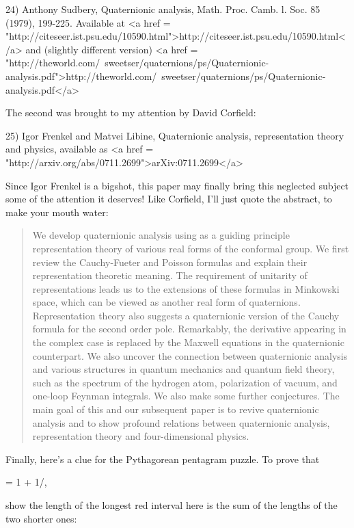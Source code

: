 24) Anthony Sudbery, Quaternionic analysis, Math. Proc. Camb. \Phi l. 
Soc. 85 (1979),  199-225.  Available at 
<a href = "http://citeseer.ist.psu.edu/10590.html">http://citeseer.ist.psu.edu/10590.html</a>
and (slightly different version)
<a href = "http://theworld.com/~sweetser/quaternions/ps/Quaternionic-analysis.pdf">http://theworld.com/~sweetser/quaternions/ps/Quaternionic-analysis.pdf</a>

The second was brought to my attention by David Corfield:

25) Igor Frenkel and Matvei Libine, Quaternionic analysis, 
representation theory and physics, available as <a href = "http://arxiv.org/abs/0711.2699">arXiv:0711.2699</a>

Since Igor Frenkel is a bigshot, this paper may finally bring this
neglected subject some of the attention it deserves!  Like Corfield, 
I'll just quote the abstract, to make your mouth water:

\begin{quote}
  We develop quaternionic analysis using as a guiding principle 
  representation theory of various real forms of the conformal 
  group.  We first review the Cauchy-Fueter and Poisson formulas 
  and explain their representation theoretic meaning.  The 
  requirement of unitarity of representations leads us to the 
  extensions of these formulas in Minkowski space, which can 
  be viewed as another real form of quaternions.  Representation 
  theory also suggests a quaternionic version of the Cauchy formula 
  for the second order pole.  Remarkably, the derivative appearing 
  in the complex case is replaced by the Maxwell equations in the 
  quaternionic counterpart.  We also uncover the connection between 
  quaternionic analysis and various structures in quantum mechanics 
  and quantum field theory, such as the spectrum of the hydrogen atom, 
  polarization of vacuum, and one-loop Feynman integrals.  We also 
  make some further conjectures.  The main goal of this and our 
  subsequent paper is to revive quaternionic analysis and to show 
  profound relations between quaternionic analysis, representation 
  theory and four-dimensional physics.
\end{quote}

Finally, here's a clue for the Pythagorean pentagram puzzle.  To 
prove that 

\Phi  = 1 + 1/\Phi ,

show the length of the longest red interval here is the sum of the 
lengths of the two shorter ones:


